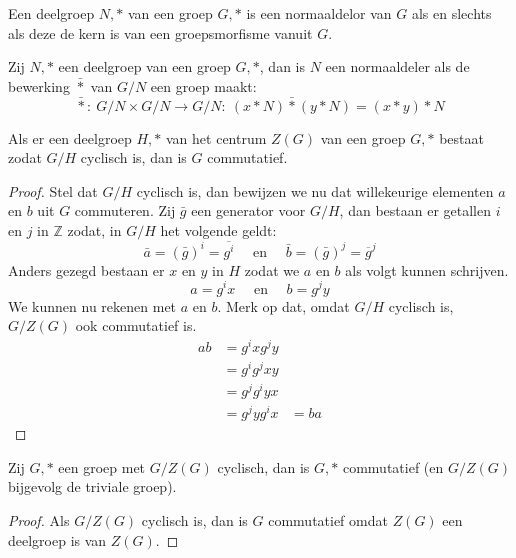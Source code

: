 \documentclass[main.tex]{subfiles}
\begin{document}
\begin{gev}
  Een deelgroep $N,*$ van een groep $G,*$ is een normaaldelor van $G$ als en slechts als deze de kern is van een groepsmorfisme vanuit $G$.
  
\end{gev}

\begin{st}
  Zij $N,*$ een deelgroep van een groep $G,*$, dan is $N$ een normaaldeler als de bewerking $\bar{*}$ van $G/N$ een groep maakt:
  \[ \bar{*}:\ G/N \times G/N \rightarrow G/N:\ (x*N)\bar{*}(y*N) = (x*y)*N \]
  \zb
\end{st}

\begin{st}
  \examen
  \label{st:deelgroep-centrum-quotient-cyclisch-groep-commutatief}
  Als er een deelgroep $H,*$ van het centrum $Z(G)$ van een groep $G,*$ bestaat zodat $G/H$ cyclisch is, dan is $G$ commutatief.
  
  \begin{proof}
    Stel dat $G/H$ cyclisch is, dan bewijzen we nu dat willekeurige elementen $a$ en $b$ uit $G$ commuteren.
    Zij $\bar{g}$ een generator voor $G/H$, dan bestaan er getallen $i$ en $j$ in $\mathbb{Z}$ zodat, in $G/H$ het volgende geldt:
    \[ \bar{a} = (\bar{g})^{i} = \overline{g^{i}} \quad\text{ en }\quad \bar{b} = (\bar{g})^{j} = \overline{g}^{j} \]
    Anders gezegd bestaan er $x$ en $y$ in $H$ zodat we $a$ en $b$ als volgt kunnen schrijven.
    \[ a = g^{i}x \quad\text{ en }\quad b = g^{j}y \]
    We kunnen nu rekenen met $a$ en $b$. Merk op dat, omdat $G/H$ cyclisch is, $G/Z(G)$ ook commutatief is.
    \[
    \begin{array}{rll}
      ab &= g^{i}xg^{j}y &\\
         &= g^{i}g^{j}xy &\\
         &= g^{j}g^{i}yx &\\
         &= g^{j}yg^{i}x &= ba
    \end{array}
    \]
  \end{proof}
\end{st}

\begin{st}
  Zij $G,*$ een groep met $G/Z(G)$ cyclisch, dan is $G,*$ commutatief (en $G/Z(G)$ bijgevolg de triviale groep).

  \begin{proof}
    Als $G/Z(G)$ cyclisch is, dan is $G$ commutatief omdat $Z(G)$ een deelgroep is van $Z(G)$.
  \end{proof}
\end{st}
\end{document}
